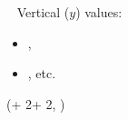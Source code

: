 \documentclass{beamer}
\newlength{\blockOne}
\newlength{\blockTwo}
\newlength{\blockFour}
\begin{document}
\begin{frame}[t]
\begin{textblock*}{\colwidth}
\begin{parblock}{~}
	\vspace{0.333333\baselineskip}\noindent%
	\alert{Vertical ($y$) values:}
	\begin{itemize}
		\setlength{\itemsep}{0pt}
		\item {},
		\item {}, etc.
	\end{itemize}
\end{parblock}

\end{textblock*}




\begin{textblock*}{\colwidth}(\leftmargin + 2\colwidth + 2\colsep, \blockFour)

\begin{parblock}{\textmd{\refname}}
	\vspace{-1.333333\baselineskip}  %
	\setlength{\bibhang}{0pt}
	\setlength{\bibsep}{0\baselineskip}
	\renewcommand*{\bibfont}{\sffamily\small\setlength{\baselineskip}{28.8pt}}
	\renewcommand*{\bf}{\bfseries}
	\begin{refcontext}[sorting = nyt]
	\printbibliography[heading = none]
	\end{refcontext}
\end{parblock}

\end{textblock*}


\end{frame}
\end{document}
